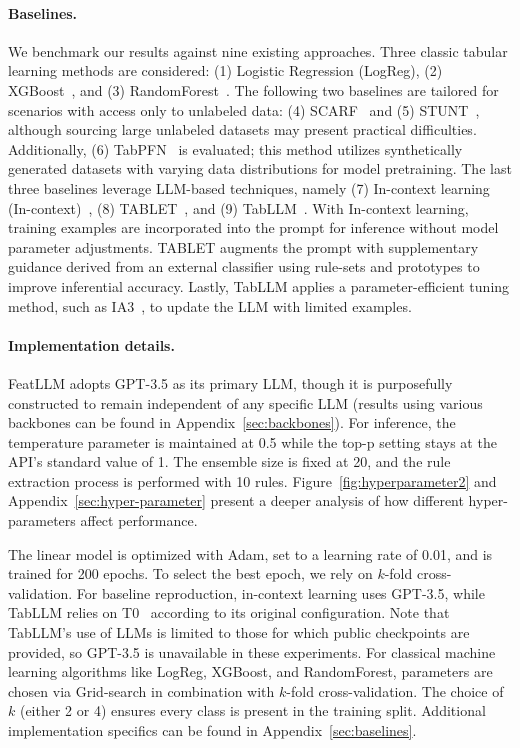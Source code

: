 \vspace*{-0.12in}
\paragraph{Baselines.}
We benchmark our results against nine existing approaches. Three classic tabular learning methods are considered: (1) Logistic Regression (LogReg), (2) XGBoost~\cite{chen2016xgboost}, and (3) RandomForest~\cite{ho1995random}. The following two baselines are tailored for scenarios with access only to unlabeled data: (4) SCARF~\cite{bahri2022scarf} and (5) STUNT~\cite{nam2023stunt}, although sourcing large unlabeled datasets may present practical difficulties. Additionally, (6) TabPFN~\cite{hollmann2022tabpfn} is evaluated; this method utilizes synthetically generated datasets with varying data distributions for model pretraining. The last three baselines leverage LLM-based techniques, namely (7) In-context learning (In-context)~\cite{wei2022emergent}, (8) TABLET~\cite{slack2023tablet}, and (9) TabLLM~\cite{hegselmann2023tabllm}. With In-context learning, training examples are incorporated into the prompt for inference without model parameter adjustments. TABLET augments the prompt with supplementary guidance derived from an external classifier using rule-sets and prototypes to improve inferential accuracy. Lastly, TabLLM applies a parameter-efficient tuning method, such as IA3~\cite{liu2022few}, to update the LLM with limited examples.

\vspace*{-0.12in}
\paragraph{Implementation details.}
\textsf{FeatLLM} adopts GPT-3.5 as its primary LLM, though it is purposefully constructed to remain independent of any specific LLM (results using various backbones can be found in Appendix~\ref{sec:backbones}). For inference, the temperature parameter is maintained at 0.5 while the top-p setting stays at the API’s standard value of 1. The ensemble size is fixed at 20, and the rule extraction process is performed with 10 rules. Figure~\ref{fig:hyperparameter2} and Appendix~\ref{sec:hyper-parameter} present a deeper analysis of how different hyper-parameters affect performance.

The linear model is optimized with Adam, set to a learning rate of 0.01, and is trained for 200 epochs. To select the best epoch, we rely on $k$-fold cross-validation. For baseline reproduction, in-context learning uses GPT-3.5, while TabLLM relies on T0~\cite{sanh2022multitask} according to its original configuration. Note that TabLLM’s use of LLMs is limited to those for which public checkpoints are provided, so GPT-3.5 is unavailable in these experiments. For classical machine learning algorithms like LogReg, XGBoost, and RandomForest, parameters are chosen via Grid-search in combination with $k$-fold cross-validation. The choice of $k$ (either 2 or 4) ensures every class is present in the training split. Additional implementation specifics can be found in Appendix~\ref{sec:baselines}.

